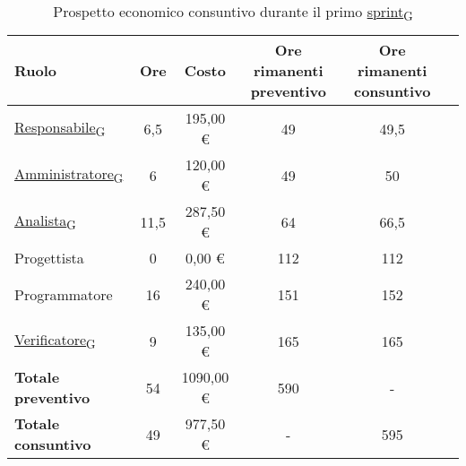 \begin{table}[!h]
	\centering
	\begin{tabular}{ | l | c | c | c | c | c | }
		\hline
		\textbf{Ruolo}             & \textbf{Ore} & \textbf{Costo} & \textbf{Ore rimanenti preventivo} & \textbf{Ore rimanenti consuntivo} \\
		\hline
		\href{https://7last.github.io/docs/rtb/documentazione-interna/glossario\#responsabile}{Responsabile\textsubscript{G}}               & 6,5          & 195,00 €       & 49                                & 49,5                              \\
		\href{https://7last.github.io/docs/rtb/documentazione-interna/glossario\#amministratore}{Amministratore\textsubscript{G}}             & 6            & 120,00 €       & 49                                & 50                                \\
		\href{https://7last.github.io/docs/rtb/documentazione-interna/glossario\#analista}{Analista\textsubscript{G}}                   & 11,5         & 287,50 €       & 64                                & 66,5                              \\
		Progettista                & 0            & 0,00 €         & 112                               & 112                               \\
		Programmatore              & 16           & 240,00 €       & 151                               & 152                               \\
		\href{https://7last.github.io/docs/rtb/documentazione-interna/glossario\#verificatore}{Verificatore\textsubscript{G}}               & 9            & 135,00 €       & 165                               & 165                               \\
		\hline
		\textbf{Totale preventivo} & 54           & 1090,00 €      & 590                               & -                                 \\
		\hline
		\textbf{Totale consuntivo} & 49           & 977,50 €       & -                                 & 595                               \\
		\hline
	\end{tabular}
	\caption{Prospetto economico consuntivo durante il primo \href{https://7last.github.io/docs/rtb/documentazione-interna/glossario\#sprint}{sprint\textsubscript{G}}}
	
\end{table}

